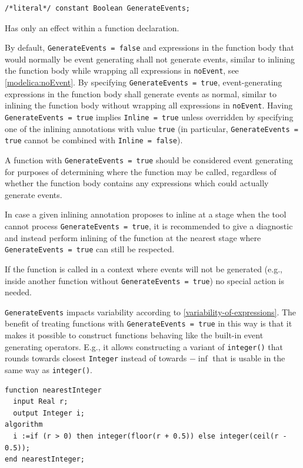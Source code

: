 \begin{annotationdefinition}[GenerateEvents]
\begin{synopsis}\begin{lstlisting}
/*literal*/ constant Boolean GenerateEvents;
\end{lstlisting}\end{synopsis}
\begin{semantics}
Has only an effect within a function declaration.

By default, {\lstinline!GenerateEvents = false!} and expressions in the function body that would normally be event generating shall not generate events, similar to inlining the function body while wrapping all expressions in {\lstinline!noEvent!}, see \cref{modelica:noEvent}.
By specifying {\lstinline!GenerateEvents = true!}, event-generating expressions in the function body shall generate events as normal, similar to inlining the function body without wrapping all expressions in {\lstinline!noEvent!}.
Having {\lstinline!GenerateEvents = true!} implies {\lstinline!Inline = true!} unless overridden by specifying one of the inlining annotations with value {\lstinline!true!} (in particular, {\lstinline!GenerateEvents = true!} cannot be combined with {\lstinline!Inline = false!}).

A function with \lstinline!GenerateEvents = true! should be considered event generating for purposes of determining where the function may be called, regardless of whether the function body contains any expressions which could actually generate events.

\begin{nonnormative}
In case a given inlining annotation proposes to inline at a stage when the tool cannot process {\lstinline!GenerateEvents = true!}, it is recommended to give a diagnostic and instead perform inlining of the function at the nearest stage where {\lstinline!GenerateEvents = true!} can still be respected.

If the function is called in a context where events will not be generated (e.g., inside another function without {\lstinline!GenerateEvents = true!}) no special action is needed.
\end{nonnormative}
\begin{example}
\lstinline!GenerateEvents! impacts variability according to \cref{variability-of-expressions}.
The benefit of treating functions with \lstinline!GenerateEvents = true! in this way is that it makes it possible to construct functions behaving like the built-in event generating operators.
E.g., it allows constructing a variant of \lstinline!integer()! that rounds towards closest \lstinline!Integer! instead of towards $-\inf$ that is usable in the same way as \lstinline!integer()!.
\begin{lstlisting}[language=modelica]
function nearestInteger
  input Real r;
  output Integer i;
algorithm
  i :=if (r > 0) then integer(floor(r + 0.5)) else integer(ceil(r - 0.5));
end nearestInteger;
\end{lstlisting}


\end{example}
\end{semantics}
\end{annotationdefinition}
